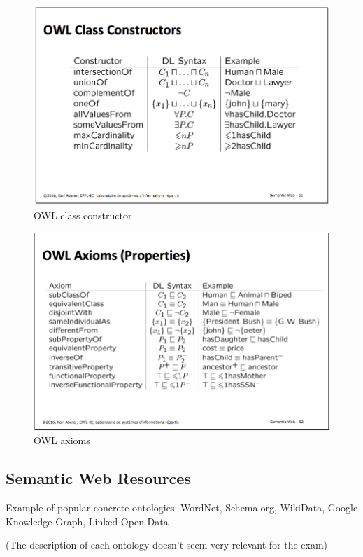 \begin{figure}[H]
\begin{center}
\includegraphics[width=1\linewidth]{figures/owl_class.png}
\end{center}
\caption{OWL class constructor}
\end{figure}

\begin{figure}[H]
\begin{center}
\includegraphics[width=1\linewidth]{figures/owl_axioms.png}
\end{center}
\caption{OWL axioms}
\end{figure}


\subsection{Semantic Web Resources}
Example of popular concrete ontologies: WordNet, Schema.org, WikiData, Google Knowledge Graph, Linked Open Data

(The description of each ontology doesn't seem very relevant for the exam)
